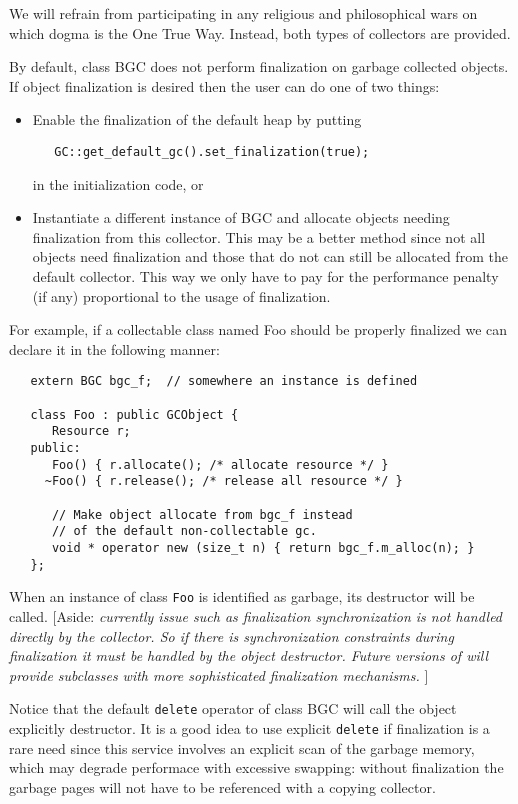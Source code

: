    We will refrain from participating in any religious and philosophical
wars on which dogma is the One True Way.  Instead, both types of collectors
are provided.

   By default, class {\sf BGC} does not perform finalization on garbage 
collected objects.  If object finalization is desired then the user
can do one of two things:
\begin{itemize}
   \item Enable the finalization of the default heap by putting
\begin{verbatim}
   GC::get_default_gc().set_finalization(true);
\end{verbatim}
   in the initialization code, or
   \item Instantiate a different instance of {\sf BGC} and
    allocate objects needing finalization from this collector.
    This may be a better method since not all objects need finalization
    and those that do not can still be allocated from the default collector.
    This way we only have to pay for the performance penalty (if any)
    proportional to the usage of finalization.
\end{itemize}

   For example, if a collectable class named {\sf Foo} should be properly
finalized we can declare it in the following manner:

\begin{verbatim}
   extern BGC bgc_f;  // somewhere an instance is defined

   class Foo : public GCObject {
      Resource r;
   public:
      Foo() { r.allocate(); /* allocate resource */ }
     ~Foo() { r.release(); /* release all resource */ }

      // Make object allocate from bgc_f instead
      // of the default non-collectable gc.
      void * operator new (size_t n) { return bgc_f.m_alloc(n); }
   };
\end{verbatim}

   When an instance of class \verb|Foo| is identified as garbage, its
destructor will be called.  [Aside: {\it currently issue such as 
finalization synchronization is not handled directly by the collector.
So if there is synchronization constraints during finalization it must
be handled by the object destructor.  Future versions of \ADLib{} will
provide subclasses with more sophisticated finalization mechanisms.} ]

   Notice that the default \verb|delete| operator of class {\sf BGC} will 
call the object explicitly destructor.  It is a good idea to use
explicit \verb|delete| if finalization is a rare need since this service
involves an explicit scan of the garbage memory, which may degrade performace
with excessive swapping: without finalization the garbage pages will not 
have to be referenced with a copying collector.

